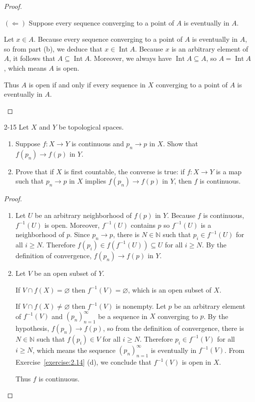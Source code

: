 \begin{proof}
\begin{enumerate}[label={(\alph*)}]
		      $(\Longleftarrow)$ Suppose every sequence converging to a point of $A$ is eventually in $A$.

		      Let $x\in A$. Because every sequence converging to a point of $A$ is eventually in $A$, so from part (b), we deduce that $x\in \operatorname{Int}A$. Because $x$ is an arbitrary element of $A$, it follows that $A\subseteq\operatorname{Int}A$. Moreover, we always have $\operatorname{Int}A\subseteq A$, so $A = \operatorname{Int}A$, which means $A$ is open.

		      Thus $A$ is open if and only if every sequence in $X$ converging to a point of $A$ is eventually in $A$.
	\end{enumerate}
\end{proof}

\begin{problem}{2-15}
Let $X$ and $Y$ be topological spaces.
\begin{enumerate}[label={(\alph*)}]
	\item Suppose $f: X\to Y$ is continuous and $p_{n}\to p$ in $X$. Show that $f(p_{n})\to f(p)$ in $Y$.
	\item Prove that if $X$ is first countable, the converse is true: if $f: X\to Y$ is a map such that $p_{n}\to p$ in $X$ implies $f(p_{n})\to f(p)$ in $Y$, then $f$ is continuous.
\end{enumerate}
\end{problem}

\begin{proof}
	\begin{enumerate}[label={(\alph*)}]
		\item Let $U$ be an arbitrary neighborhood of $f(p)$ in $Y$. Because $f$ is continuous, $f^{-1}(U)$ is open. Moreover, $f^{-1}(U)$ contains $p$ so $f^{-1}(U)$ is a neighborhood of $p$. Since $p_{n}\to p$, there is $N\in\mathbb{N}$ such that $p_{i}\in f^{-1}(U)$ for all $i\geq N$. Therefore $f(p_{i})\in f(f^{-1}(U))\subseteq U$ for all $i\geq N$. By the definition of convergence, $f(p_{n})\to f(p)$ in $Y$.
		\item Let $V$ be an open subset of $Y$.

		      If $V\cap f(X) = \varnothing$ then $f^{-1}(V) = \varnothing$, which is an open subset of $X$.

		      If $V\cap f(X) \ne \varnothing$ then $f^{-1}(V)$ is nonempty. Let $p$ be an arbitrary element of $f^{-1}(V)$ and ${(p_{n})}^{\infty}_{n=1}$ be a sequence in $X$ converging to $p$. By the hypothesis, $f(p_{n})\to f(p)$, so from the definition of convergence, there is $N\in\mathbb{N}$ such that $f(p_{i})\in V$ for all $i\geq N$. Therefore $p_{i}\in f^{-1}(V)$ for all $i\geq N$, which means the sequence ${(p_{n})}^{\infty}_{n=1}$ is eventually in $f^{-1}(V)$. From Exercise~\ref{exercise:2.14} (d), we conclude that $f^{-1}(V)$ is open in $X$.

		      Thus $f$ is continuous.
	\end{enumerate}
\end{proof}


